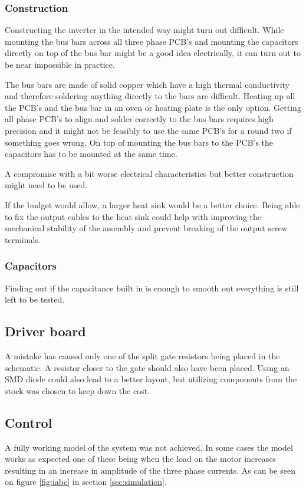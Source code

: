 \subsubsection{Construction}
Constructing the inverter in the intended way might turn out difficult. While mounting the bus bars across all three phase PCB's and mounting the capacitors directly on top of the bus bar might be a good idea electrically, it can turn out to be near impossible in practice.

The bus bars are made of solid copper which have a high thermal conductivity and therefore soldering anything directly to the bars are difficult. Heating up all the PCB's and the bus bar in an oven or heating plate is the only option. 
Getting all phase PCB's to align and solder correctly to the bus bars requires high precision and it might not be feasibly to use the same PCB's for a round two if something goes wrong.
On top of mounting the bus bars to the PCB's the capacitors has to be mounted at the same time. 

A compromise with a bit worse electrical characteristics but better construction might need to be used.

If the budget would allow, a larger heat sink would be a better choice. Being able to fix the output cables to the heat sink could help with improving the mechanical stability of the assembly and prevent breaking of the output screw terminals.

\subsubsection{Capacitors}
Finding out if the capacitance built in is enough to smooth out everything is still left to be tested.

\subsection{Driver board}
A mistake has caused only one of the split gate resistors being placed in the schematic. A resistor closer to the gate should also have been placed. Using an SMD diode could also lead to a better layout, but utilizing components from the stock was chosen to keep down the cost.

\subsection{Control}
A fully working model of the system was not achieved.
In some cases the model works as expected one of these being when the load on the motor increases resulting in an increase in amplitude of the three phase currents. As can be seen on figure \ref{fig:iabc} in section \ref{sec:simulation}.

